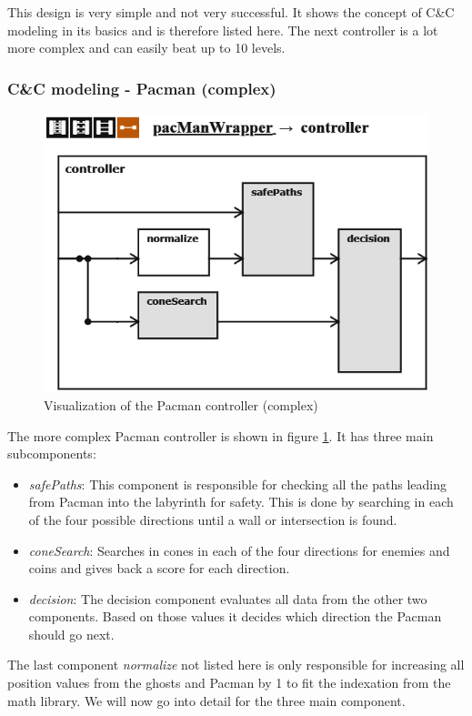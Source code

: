This design is very simple and not very successful. It shows the concept of C\&C modeling in its basics and is therefore listed here. The next controller is a lot more complex and can easily beat up to 10 levels.

\subsubsection{C\&C modeling - Pacman (complex)}
\begin{figure}
	\caption{Visualization of the Pacman controller (complex)}
	\label{fig:visPacman20}
	\centering
	\includegraphics[width=\textwidth]{pictures/Pacman/Controller20.png}
\end{figure}

The more complex Pacman controller is shown in figure \ref{fig:visPacman20}.
It has three main subcomponents:
\begin{itemize}
	\item \textit{safePaths}: This component is responsible for checking all the paths leading from Pacman into the labyrinth for safety. This is done by searching in each of the four possible directions until a wall or intersection is found.	
	\item \textit{coneSearch}: Searches in cones in each of the four directions for enemies and coins and gives back a score for each direction.	
	\item \textit{decision}: The decision component evaluates all data from the other two components. Based on those values it decides which direction the Pacman should go next.	
\end{itemize}
The last component \textit{normalize} not listed here is only responsible for increasing all position values from the ghosts and Pacman by 1 to fit the indexation from the math library.
We will now go into detail for the three main component.
\newline

